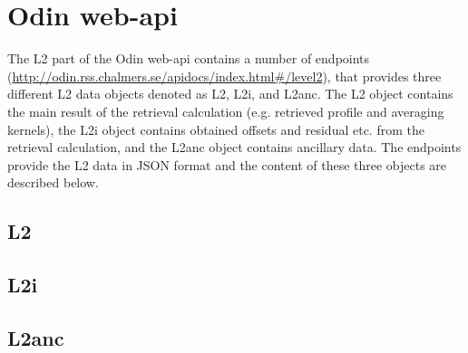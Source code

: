 \section{Odin web-api}

The L2 part of the Odin web-api contains a number of endpoints
(\url{http://odin.rss.chalmers.se/apidocs/index.html#/level2}),
that provides three different L2 data objects denoted as
L2, L2i, and L2anc. The L2 object contains the main result of
the retrieval calculation (e.g. retrieved profile and averaging kernels), 
the L2i object contains obtained offsets and residual etc. from the
retrieval calculation, and the L2anc object contains ancillary data.
The endpoints provide the L2 data in JSON format
and the content of these three objects are described below.

\subsection{L2}

\subsection{L2i}

\subsection{L2anc}

